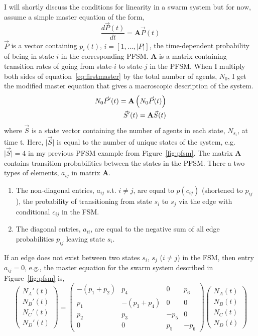 \documentclass[defaultstyle,12pt]{proposal}
\newcommand{\abs}[1]{\lvert#1\rvert}
\newcommand{\D}[2][t]{\frac{d#2}{d#1}}
\begin{document}
I will shortly discuss the conditions for linearity in a swarm system but for now, assume a simple master equation of the form,
\begin{equation}
\D{\vec{P}(t)} = \mathbf{A}\vec{P}(t)\label{eq:firstmaster}
\end{equation}
$\vec{P}$ is a vector containing $p_i(t)$, $i = [1, \ldots, |P|]$, the time-dependent probability of being in state-$i$ in the corresponding PFSM. $\mathbf{A}$ is a matrix containing transition rates of going from state-$i$ to state-$j$ in the PFSM. When I multiply both sides of equation~\eqref{eq:firstmaster} by the total number of agents, $N_0$, I get the modified master equation that gives a macroscopic description of the system.
\begin{align}
N_0 \vec{P}'(t) = \mathbf{A}\left(N_0\vec{P}(t)\right)\notag\\
\vec{S}'(t) = \mathbf{A}\vec{S}(t)\label{eq:master}
\end{align}
where $\vec{S}$ is a state vector containing the number of agents in each state, $N_{s_i}$, at time t. Here, $\abs{\vec{S}}$ is equal to the number of unique states of the system, e.g. $\abs{\vec{S}} = 4$ in my previous PFSM example from Figure~\ref{fig:pfsm}. The matrix $\mathbf{A}$ contains transition probabilities between the states in the PFSM. There a two types of elements, $a_{ij}$ in matrix $\mathbf{A}$.
\begin{enumerate}
\item The non-diagonal entries, $a_{ij}$ s.t. $i\not=j$, are equal to $p(c_{ij})$ (shortened to $p_{ij}$), the probability of transitioning from state $s_i$ to $s_j$ via the edge with conditional $c_{ij}$ in the FSM.
\item The diagonal entries, $a_{ii}$, are equal to the negative sum of all edge probabilities $p_{ij}$ leaving state $s_i$.
\end{enumerate} 
If an edge does not exist between two states $s_i$, $s_j$ ($i\not=j$) in the FSM, then entry $a_{ij} = 0$, e.g., the master equation for the swarm system described in Figure~\ref{fig:pfsm} is,
\begin{equation}\label{eq:mastereqns}
\left(
	\begin{array}{c}N_A'(t) \\ N_B'(t) \\ N_C'(t) \\ N_D'(t)\end{array}
\right) =
\left(
	\begin{array}{cccc}
	-(p_1 + p_2) & p_4 & 0 & p_6\\
	p_1 & -(p_3 + p_4) & 0 & 0\\
	p_2 & p_3 & -p_5 & 0\\
	0 & 0 & p_5 & -p_6
	\end{array}
\right)
\left(\begin{array}{c}N_A(t) \\ N_B(t) \\ N_C(t) \\ N_D(t)\end{array}\right)
\end{equation}
\end{document}
